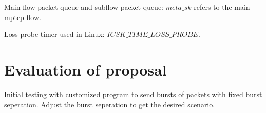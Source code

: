 \documentclass[10pt,draftcls,twocolumn]{IEEEconf}
\begin{document}
Main flow packet queue and subflow packet queue: ${meta\_sk}$ refers to the
main mptcp flow.

Loss probe timer used in Linux: ${ICSK\_TIME\_LOSS\_PROBE}$.

\section{Evaluation of proposal}

Initial testing with customized program to send bursts of packets with fixed burst seperation. Adjust the burst seperation to get the desired scenario.







\end{document}
